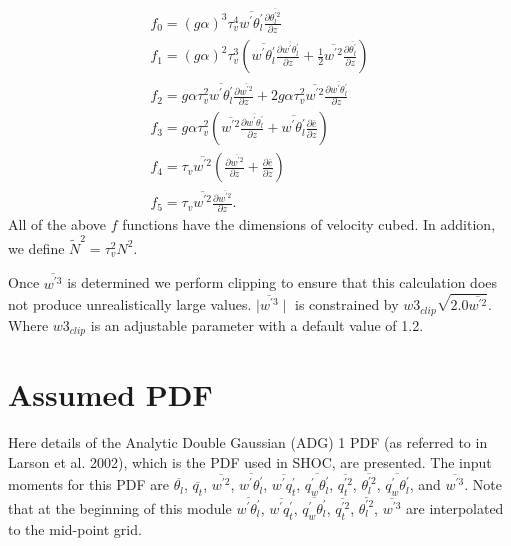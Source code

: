 \documentclass[12pt,titlepage]{article}
\numberwithin{equation}{section}
\begin{document}
%
\begin{equation}
  \label{f_functions}
  \begin{split}
  f_{0}=\left(g\alpha\right)^{3}\tau_{v}^{4}\overline{w^{'}\theta_{l}^{'}}\frac{\partial{\overline{\theta_{l}^{'2}}}}{\partial{z}}\\
  f_{1}=\left(g\alpha\right)^{2}\tau_{v}^{3}\left(\overline{w^{'}\theta_{l}^{'}}\frac{\partial{\overline{w^{'}\theta_{l}^{'}}}}{\partial{z}}+\frac{1}{2}\overline{w^{'2}}\frac{\partial{\overline{\theta_{l}^{'}}}}{\partial{z}}\right)\\
  f_{2}=g\alpha\tau_{v}^{2}\overline{w^{'}\theta_{l}^{'}}\frac{\partial{\overline{w^{'2}}}}{\partial{z}}+2g\alpha\tau_{v}^{2}\overline{w^{'2}}\frac{\partial{\overline{w^{'}\theta_{l}^{'}}}}{\partial{z}}\\
  f_{3}=g\alpha\tau_{v}^{2}\left(\overline{w^{'2}}\frac{\partial{\overline{w^{'}\theta_{l}^{'}}}}{\partial{z}}+\overline{w^{'}\theta_{l}^{'}}\frac{\partial{\overline{e}}}{\partial{z}}\right)\\
  f_{4}=\tau_{v}\overline{w^{'2}}\left(\frac{\partial{\overline{w^{'2}}}}{\partial{z}}+\frac{\partial{\overline{e}}}{\partial{z}}\right)\\
  f_{5}=\tau_{v}\overline{w^{'2}}\frac{\partial{\overline{w^{'2}}}}{\partial{z}}.
  \end{split}
\end{equation}
%
All of the above $f$ functions have the dimensions of velocity cubed.  In addition, we define $\tilde{N}^{2}=\tau_{v}^{2}N^{2}$.

Once $\overline{w^{'3}}$ is determined we perform clipping to ensure that this calculation does not produce unrealistically large values.  $\mid\overline{w^{'3}}\mid$ is constrained by $ w3_{clip} \sqrt{2.0 \overline{w^{'2}}} $.  Where $w3_{clip}$ is an adjustable parameter with a default value of 1.2.   

\section{Assumed PDF}
\label{assumed_pdf}
%
Here details of the Analytic Double Gaussian (ADG) 1 PDF (as referred to in Larson et al. 2002), which is the PDF used in SHOC, are presented.  The input moments for this PDF are $\overline{\theta_{l}}$, $\overline{q_{t}}$, $\overline{w^{'2}}$, $\overline{w^{'}\theta_{l}^{'}}$, $\overline{w^{'}q_{t}^{'}}$, $\overline{q_{w}^{'}\theta_{l}^{'}}$, $\overline{q_{t}^{'2}}$, $\overline{\theta_{l}^{'2}}$, $\overline{q_{w}^{'}\theta_{l}^{'}}$, and $\overline{w^{'3}}$.  Note that at the beginning of this module $\overline{w^{'}\theta_{l}^{'}}$, $\overline{w^{'}q_{t}^{'}}$, $\overline{q_{w}^{'}\theta_{l}^{'}}$, $\overline{q_{t}^{'2}}$, $\overline{\theta_{l}^{'2}}$, $\overline{w^{'3}}$ are interpolated to the mid-point grid.  
\end{document}
